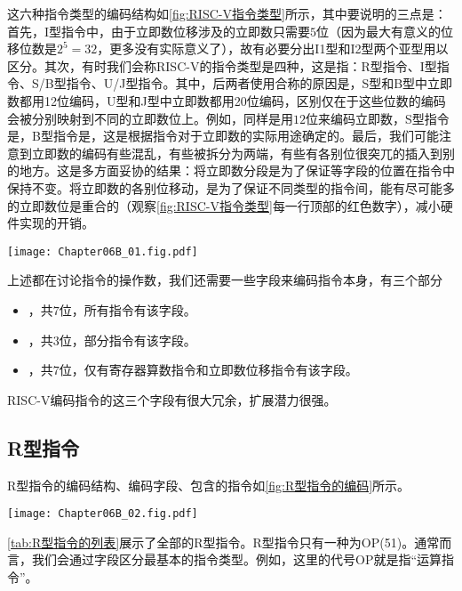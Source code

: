 这六种指令类型的编码结构如\cref{fig:RISC-V指令类型}所示，其中要说明的三点是：首先，I型指令中，由于立即数位移涉及的立即数只需要$5$位（因为最大有意义的位移位数是$2^5=32$，更多没有实际意义了），故有必要分出I1型和I2型两个亚型用以区分。其次，有时我们会称RISC-V的指令类型是四种，这是指：R型指令、I型指令、S/B型指令、U/J型指令。其中，后两者使用合称的原因是，S型和B型中立即数都用12位编码，U型和J型中立即数都用20位编码，区别仅在于这些位数的编码会被分别映射到不同的立即数位上。例如，同样是用$12$位来编码立即数，S型指令是，B型指令是，这是根据指令对于立即数的实际用途确定的。最后，我们可能注意到立即数的编码有些混乱，有些被拆分为两端，有些有各别位很突兀的插入到别的地方。这是多方面妥协的结果：将立即数分段是为了保证等字段的位置在指令中保持不变。将立即数的各别位移动，是为了保证不同类型的指令间，能有尽可能多的立即数位是重合的（观察\cref{fig:RISC-V指令类型}每一行顶部的红色数字），减小硬件实现的开销。

\begin{Figure}
    \texttt{[image: Chapter06B\_01.fig.pdf]}
\end{Figure}

上述都在讨论指令的操作数，我们还需要一些字段来编码指令本身，有三个部分
\begin{itemize}
    \item {}，共$7$位，所有指令有该字段。
    \item {}，共$3$位，部分指令有该字段。
    \item {}，共$7$位，仅有寄存器算数指令和立即数位移指令有该字段。
\end{itemize}

RISC-V编码指令的这三个字段有很大冗余，扩展潜力很强。

\subsection{R型指令}

R型指令的编码结构、编码字段、包含的指令如\cref{fig:R型指令的编码}所示。
\begin{Figure}[R型指令的编码]
    \texttt{[image: Chapter06B\_02.fig.pdf]}
\end{Figure}

\cref{tab:R型指令的列表}展示了全部的R型指令。R型指令只有一种为OP(51)。通常而言，我们会通过字段区分最基本的指令类型。例如，这里的代号OP就是指“运算指令”。

